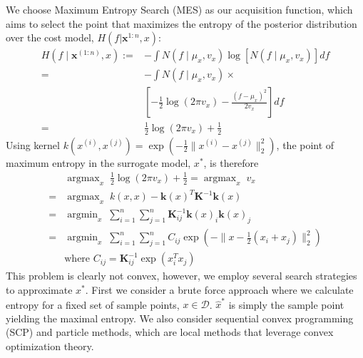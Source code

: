 \documentclass[10pt,twocolumn,letterpaper]{article}
\begin{document}
We choose Maximum Entropy Search (MES) as our acquisition function, which aims to select the point that maximizes the entropy of the posterior distribution over the cost model, $H(f | \textbf{x}^{1:n}, x)$:
\begin{align*}
    H(f \mid \textbf{x}^{(1:n)}, x) :=& -\int N(f \mid \mu_x, v_x) \log\left[N(f \mid \mu_x, v_x)\right]df\\
    =& -\int N(f \mid \mu_x, v_x) \times \\
    & \left[-\frac{1}{2}\log(2\pi v_x) - \frac{(f - \mu_x)^2}{2v_x}\right]df\\
    =& \frac{1}{2}\log(2\pi v_x) + \frac{1}{2}
\end{align*}
Using kernel $k(x^{(i)}, x^{(j)}) = \exp\left(-\frac{1}{2}\lVert x^{(i)} - x^{(j)}\rVert^2_2\right)$, the point of maximum entropy in the surrogate model, $x^*$, is therefore
\begin{align*}
    &\; \textrm{argmax}_x \;\; \frac{1}{2}\log(2\pi v_x) + \frac{1}{2} = \; \textrm{argmax}_x \;\; v_x \\
    =&\; \textrm{argmax}_x \;\; k(x, x) - \textbf{k}(x)^T\textbf{K}^{-1}\textbf{k}(x)\\
    =&\; \textrm{argmin}_x \;\; \sum_{i=1}^n\sum_{j=1}^n \textbf{K}^{-1}_{ij} \textbf{k}(x)_i \textbf{k}(x)_j\\
    =&\; \textrm{argmin}_x \;\; \sum_{i=1}^n\sum_{j=1}^n C_{ij} \exp\left(-\lVert x - \frac{1}{2}(x_i + x_j)\rVert _2^2\right)\\
    &\textrm{where } C_{ij} = \textbf{K}^{-1}_{ij}\exp(x_i^Tx_j)
\end{align*}
This problem is clearly not convex, however, we employ several search strategies to approximate $x^*$. First we consider a brute force approach where we calculate entropy for a fixed set of sample points, $x \in \mathcal{D}$. $\hat{x}^*$ is simply the sample point yielding the maximal entropy. We also consider sequential convex programming (SCP) and particle methods, which are local methods that leverage convex optimization theory. 
\end{document}
